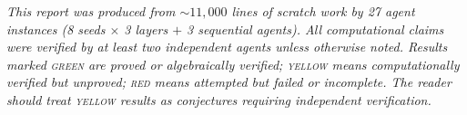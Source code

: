 \documentclass[11pt]{article}
\theoremstyle{definition}
\begin{document}
\bigskip
\noindent\textit{This report was produced from ${\sim}11{,}000$ lines of scratch work by 27 agent instances (8 seeds $\times$ 3 layers $+$ 3 sequential agents). All computational claims were verified by at least two independent agents unless otherwise noted. Results marked \textsc{green} are proved or algebraically verified; \textsc{yellow} means computationally verified but unproved; \textsc{red} means attempted but failed or incomplete. The reader should treat \textsc{yellow} results as conjectures requiring independent verification.}
\end{document}
